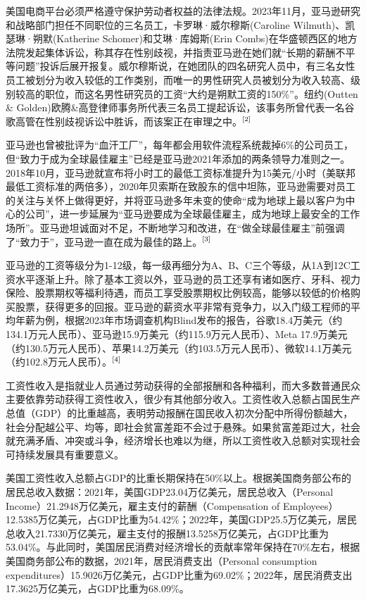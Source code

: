 \documentclass[12pt,twoside,utf8]{ctexart}
\begin{document}
美国电商平台必须严格遵守保护劳动者权益的法律法规。2023年11月，亚马逊研究和战略部门担任不同职位的三名员工，卡罗琳·威尔穆斯(Caroline Wilmuth)、凯瑟琳·朔默(Katherine Schomer)和艾琳·库姆斯(Erin Combs)在华盛顿西区的地方法院发起集体诉讼，称其存在性别歧视，并指责亚马逊在她们就“长期的薪酬不平等问题”投诉后展开报复。威尔穆斯说，在她团队的四名研究人员中，有三名女性员工被划分为收入较低的工作类别，而唯一的男性研究人员被划分为收入较高、级别较高的职位，而这名男性研究员的工资“大约是朔默工资的150\%”。纽约(Outten \& Golden)欧腾\&高登律师事务所代表三名员工提起诉讼，该事务所曾代表一名谷歌高管在性别歧视诉讼中胜诉，而该案正在审理之中。$\textsuperscript{[2]}$

亚马逊也曾被批评为“血汗工厂”，每年都会用软件流程系统裁掉6\%的公司员工，但“致力于成为全球最佳雇主”已经是亚马逊2021年添加的两条领导力准则之一。2018年10月，亚马逊就宣布将小时工的最低工资标准提升为15美元/小时（美联邦最低工资标准的两倍多），2020年贝索斯在致股东的信中坦陈，亚马逊需要对员工的关注与关怀上做得更好，并将亚马逊多年未变的使命“成为地球上最以客户为中心的公司”，进一步延展为“亚马逊要成为全球最佳雇主，成为地球上最安全的工作场所”。亚马逊坦诚面对不足，不断地学习和改进，在“做全球最佳雇主”前强调了“致力于”，亚马逊一直在成为最佳的路上。$\textsuperscript{[3]}$

亚马逊的工资等级分为1-12级，每一级再细分为A、B、C三个等级，从1A到12C工资水平逐渐上升。除了基本工资以外，亚马逊的员工还享有诸如医疗、牙科、视力保险、股票期权等福利待遇，而员工享受股票期权比例较高，能够以较低的价格购买股票，获得更多的回报。亚马逊的薪资水平非常有竞争力，以入门级工程师的平均年薪为例，根据2023年市场调查机构Blind发布的报告，谷歌18.4万美元（约134.1万元人民币）、亚马逊15.9万美元（约115.9万元人民币）、Meta 17.9万美元（约130.5万元人民币）、苹果14.2万美元（约103.5万元人民币）、微软14.1万美元（约102.8万元人民币）。$\textsuperscript{[4]}$

工资性收入是指就业人员通过劳动获得的全部报酬和各种福利，而大多数普通民众主要依靠劳动获得工资性收入，很少有其他部分收入。工资性收入总额占国民生产总值（GDP）的比重越高，表明劳动报酬在国民收入初次分配中所得份额越大，社会分配越公平、均等，即社会贫富差距不会过于悬殊。如果贫富差距过大，社会就充满矛盾、冲突或斗争，经济增长也难以为继，所以工资性收入总额对实现社会可持续发展具有重要意义。

美国工资性收入总额占GDP的比重长期保持在50\%以上。根据美国商务部公布的居民总收入数据：2021年，美国GDP23.04万亿美元，居民总收入（Personal Income）21.2948万亿美元，雇主支付的薪酬（Compensation of Employees）12.5385万亿美元，占GDP比重为54.42\%；2022年，美国GDP25.5万亿美元，居民总收入21.7330万亿美元，雇主支付的报酬13.5258万亿美元，占GDP比重为53.04\%。与此同时，美国居民消费对经济增长的贡献率常年保持在70\%左右，根据美国商务部公布的数据，2021年，居民消费支出（Personal consumption expenditures）15.9026万亿美元，占GDP比重为69.02\%；2022年，居民消费支出17.3625万亿美元，占GDP比重为68.09\%。
\end{document}
